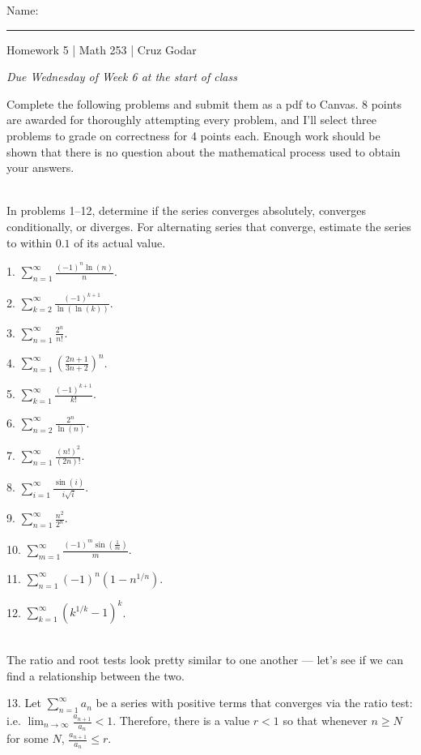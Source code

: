 \documentclass{article}
\begin{document}
\Large Name: \rule{2in}{0.15mm} \hfill Homework 5 | Math 253 | Cruz Godar \vspace{4pt}  \normalsize

\textit{Due Wednesday of Week 6 at the start of class}

Complete the following problems and submit them as a pdf to Canvas. 8 points are awarded for thoroughly attempting every problem, and I'll select three problems to grade on correctness for 4 points each. Enough work should be shown that there is no question about the mathematical process used to obtain your answers.

~\\

In problems 1--12, determine if the series converges absolutely, converges conditionally, or diverges. For alternating series that converge, estimate the series to within $0.1$ of its actual value.

1. $\displaystyle \sum_{n = 1}^\infty \frac{(-1)^n\ln(n)}{n}$.

2. $\displaystyle \sum_{k = 2}^\infty \frac{(-1)^{k + 1}}{\ln(\ln(k))}$.

3. $\displaystyle \sum_{n = 1}^\infty \frac{2^n}{n!}$.

4. $\displaystyle \sum_{n = 1}^\infty \left( \frac{2n + 1}{3n + 2} \right)^n$.

5. $\displaystyle \sum_{k = 1}^\infty \frac{(-1)^{k + 1}}{k!}$.

6. $\displaystyle \sum_{n = 2}^\infty \frac{2^n}{\ln(n)}$.

7. $\displaystyle \sum_{n = 1}^\infty \frac{(n!)^2}{(2n)!}$.

8. $\displaystyle \sum_{i = 1}^\infty \frac{\sin(i)}{i\sqrt{i}}$.

9. $\displaystyle \sum_{n = 1}^\infty \frac{n^2}{2^n}$.

10. $\displaystyle \sum_{m = 1}^\infty \frac{(-1)^m \sin\left( \frac{1}{m} \right)}{m}$.

11. $\displaystyle \sum_{n = 1}^\infty (-1)^n \left( 1 - n^{1/n} \right)$.

12. $\displaystyle \sum_{k = 1}^\infty \left( k^{1/k} - 1 \right)^k$.

~\\

The ratio and root tests look pretty similar to one another --- let's see if we can find a relationship between the two.

13. Let $\displaystyle \sum_{n = 1}^\infty a_n$ be a series with positive terms that converges via the ratio test: i.e. $\displaystyle \lim_{n \to \infty} \frac{a_{n + 1}}{a_n} < 1$. Therefore, there is a value $r < 1$ so that whenever $n \geq N$ for some $N$, $\frac{a_{n + 1}}{a_n} \leq r$.
\end{document}
